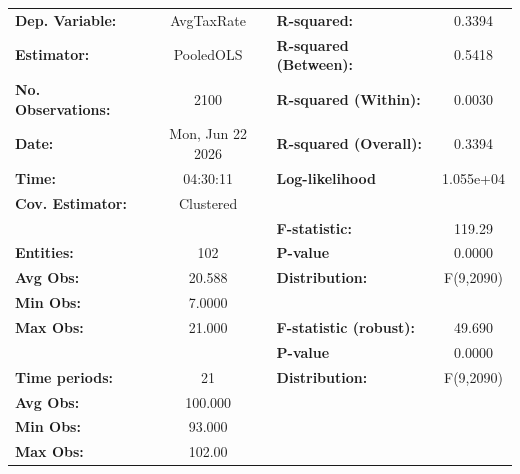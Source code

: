 \begin{center}
\begin{tabular}{lclc}
\toprule
\textbf{Dep. Variable:}                       &     AvgTaxRate     & \textbf{  R-squared:         }   &      0.3394      \\
\textbf{Estimator:}                           &     PooledOLS      & \textbf{  R-squared (Between):}  &      0.5418      \\
\textbf{No. Observations:}                    &        2100        & \textbf{  R-squared (Within):}   &      0.0030      \\
\textbf{Date:}                                &  Mon, Jun 22 2026  & \textbf{  R-squared (Overall):}  &      0.3394      \\
\textbf{Time:}                                &      04:30:11      & \textbf{  Log-likelihood     }   &    1.055e+04     \\
\textbf{Cov. Estimator:}                      &     Clustered      & \textbf{                     }   &                  \\
\textbf{}                                     &                    & \textbf{  F-statistic:       }   &      119.29      \\
\textbf{Entities:}                            &        102         & \textbf{  P-value            }   &      0.0000      \\
\textbf{Avg Obs:}                             &       20.588       & \textbf{  Distribution:      }   &    F(9,2090)     \\
\textbf{Min Obs:}                             &       7.0000       & \textbf{                     }   &                  \\
\textbf{Max Obs:}                             &       21.000       & \textbf{  F-statistic (robust):} &      49.690      \\
\textbf{}                                     &                    & \textbf{  P-value            }   &      0.0000      \\
\textbf{Time periods:}                        &         21         & \textbf{  Distribution:      }   &    F(9,2090)     \\
\textbf{Avg Obs:}                             &      100.000       & \textbf{                     }   &                  \\
\textbf{Min Obs:}                             &       93.000       & \textbf{                     }   &                  \\
\textbf{Max Obs:}                             &       102.00       & \textbf{                     }   &                  \\

\end{tabular}
\end{center}
